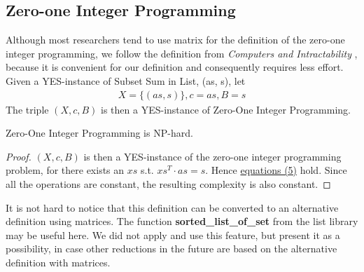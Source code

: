 \subsection{Zero-one Integer Programming}
Although most researchers tend to use matrix for the 
definition of the zero-one integer programming, we follow the definition from \textit{Computers and Intractability} \cite{garey1979computers}, because 
it is convenient for our definition and consequently requires less effort. 
Given a YES-instance of Subset Sum in List,
(as, s), let 
\begin{align*}
    X = \{(as, s)\}, c = as, B = s 
\end{align*} 
The triple $(X, c, B)$ is then a YES-instance of Zero-One Integer Programming.
\begin{theorem}
    Zero-One Integer Programming is NP-hard.
\end{theorem}
\begin{proof}
    $(X, c, B)$ is then a YES-instance of the zero-one integer programming problem,
    for there exists an $xs$ s.t. $xs^T \cdot as = s$. Hence \hyperref[eq:5]{equations (5)} hold.
    Since all the operations are constant, the resulting complexity is also constant.
\end{proof}
It is not hard to notice that this definition can be converted to an alternative definition using matrices. 
The function \textbf{sorted\_list\_of\_set} from the list library may be useful here. 
We did not apply and use this feature, but present it as a possibility, 
in case other reductions in the future are based on the alternative definition with matrices.
